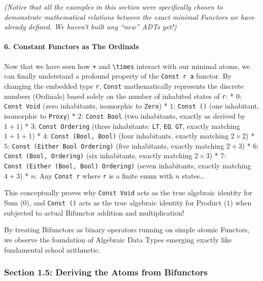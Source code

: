 \documentclass[
]{article}
\begin{document}
\emph{(Notice that all the examples in this section were specifically
chosen to demonstrate mathematical relations between the exact minimal
Functors we have already defined. We haven't built any ``new'' ADTs
yet!)}

\paragraph{6. Constant Functors as The
Ordinals}\label{constant-functors-as-the-ordinals}

Now that we have seen how \texttt{+} and \texttt{\textbackslash{}times}
interact with our minimal atoms, we can finally understand a profound
property of the \texttt{Const\ r\ a} functor. By changing the embedded
type \texttt{r}, \texttt{Const} mathematically represents the discrete
numbers (Ordinals) based solely on the number of inhabited states of
\texttt{r}: * \textbf{\(0\)}: \texttt{Const\ Void} (zero inhabitants,
isomorphic to \texttt{Zero}) * \textbf{\(1\)}: \texttt{Const\ ()} (one
inhabitant, isomorphic to \texttt{Proxy}) * \textbf{\(2\)}:
\texttt{Const\ Bool} (two inhabitants, exactly as derived by \(1 + 1\))
* \textbf{\(3\)}: \texttt{Const\ Ordering} (three inhabitants:
\texttt{LT}, \texttt{EQ}, \texttt{GT}, exactly matching \(1 + 1 + 1\)) *
\textbf{\(4\)}: \texttt{Const\ (Bool,\ Bool)} (four inhabitants, exactly
matching \(2 \times 2\)) * \textbf{\(5\)}:
\texttt{Const\ (Either\ Bool\ Ordering)} (five inhabitants, exactly
matching \(2 + 3\)) * \textbf{\(6\)}: \texttt{Const\ (Bool,\ Ordering)}
(six inhabitants, exactly matching \(2 \times 3\)) * \textbf{\(7\)}:
\texttt{Const\ (Either\ (Bool,\ Bool)\ Ordering)} (seven inhabitants,
exactly matching \(4 + 3\)) * \textbf{\(n\)}: Any \texttt{Const\ r}
where \texttt{r} is a finite enum with \(n\) states\ldots{}

This conceptually proves why \texttt{Const\ Void} acts as the true
algebraic identity for Sum (\(0\)), and \texttt{Const\ ()} acts as the
true algebraic identity for Product (\(1\)) when subjected to actual
Bifunctor addition and multiplication!

By treating Bifunctors as binary operators running on simple atomic
Functors, we observe the foundation of Algebraic Data Types emerging
exactly like fundamental school arithmetic.

\subsubsection{Section 1.5: Deriving the Atoms from
Bifunctors}\label{section-1.5-deriving-the-atoms-from-bifunctors}
\end{document}
